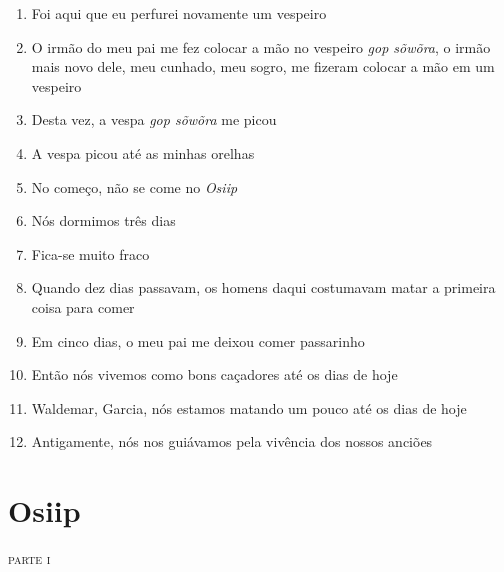 \begin{enumerate}
 \item Foi aqui que eu perfurei novamente um vespeiro
 \item O irmão do meu pai me fez colocar a mão no vespeiro \textit{gop
 sõwõra}, o irmão mais novo dele, meu cunhado, meu sogro, me fizeram
 colocar a mão em um vespeiro
 \item Desta vez, a vespa \textit{gop sõwõra} me picou
 \item A vespa picou até as minhas orelhas
 
 \begin{center}\end{center}
 
 \item No começo, não se come no \textit{Osiip}
 \item Nós dormimos três dias
 \item Fica-se muito fraco
 \item Quando dez dias passavam, os homens daqui costumavam matar a
 primeira coisa para comer
 \item Em cinco dias, o meu pai me deixou comer passarinho
 
 \begin{center}\end{center}
 
 \item Então nós vivemos como bons caçadores até os dias de hoje
 \item Waldemar, Garcia, nós estamos matando um pouco até os dias de hoje
 \item Antigamente, nós nos guiávamos pela vivência dos nossos anciões
\end{enumerate}
 \chapter{Osiip}

\begin{flushright}\textsc{parte i}\end{flushright}

